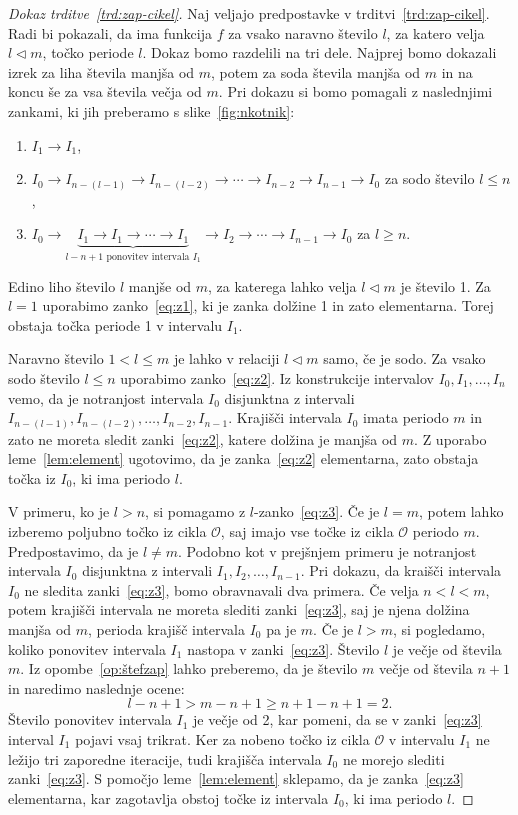 \documentclass[../TG_magistrsko_delo_sections.tex]{subfiles}
\begin{document}
\begin{proof}[Dokaz trditve~\ref{trd:zap-cikel}]
Naj veljajo predpostavke v trditvi~\ref{trd:zap-cikel}. Radi bi pokazali, da ima funkcija $f$ za vsako naravno število $l$, za katero velja $l\triangleleft m$, točko periode $l$. Dokaz bomo razdelili na tri dele. Najprej bomo dokazali izrek za liha števila manjša od $m$, potem za soda števila manjša od $m$ in na koncu še za vsa števila večja od $m$.
Pri dokazu si bomo pomagali z naslednjimi zankami, ki jih preberamo s slike~\ref{fig:nkotnik}:
\begin{enumerate}[label={(Z\arabic*)}]
\item $I_1 \to I_1$,\label{eq:z1}
\item$I_0\to I_{n-(l-1)} \to I_{n-(l-2)} \to \cdots \to I_{n-2} \to I_{n-1} \to I_0$ za sodo število $l \leq n$,\label{eq:z2}
\item $I_0\to\underbrace{I_1 \to I_1 \to \cdots  \to I_1}_{l - n +1 \text{ ponovitev intervala } I_1} \to I_2 \to \cdots \to I_{n-1} \to I_0 $ za $l \geq n$.\label{eq:z3}
\end{enumerate}
Edino liho število $l$ manjše od $m$, za katerega lahko velja $l\triangleleft m$ je število 1. Za $l=1$ uporabimo zanko~\ref{eq:z1}, ki je zanka dolžine 1 in zato elementarna. Torej obstaja točka periode 1 v intervalu $I_1$.

Naravno število  $1<l \leq m$ je lahko v relaciji $l \triangleleft m$ samo, če je sodo. Za vsako sodo število $l \leq n$ uporabimo zanko~\ref{eq:z2}.
Iz konstrukcije intervalov $I_0, I_1, \dots, I_n$ vemo, da je notranjost intervala $I_0$ disjunktna z intervali $I_{n-(l-1)}, I_{n-(l-2)}, \dots, I_{n-2}, I_{n-1}$. Krajišči intervala $I_0$ imata periodo $m$ in zato ne moreta sledit zanki~\ref{eq:z2}, katere dolžina je manjša od $m$. Z uporabo leme~\ref{lem:element} ugotovimo, da je zanka~\ref{eq:z2} elementarna, zato obstaja točka iz $I_0$, ki ima periodo $l$.

V primeru, ko je $l >n$, si pomagamo z $l$-zanko~\ref{eq:z3}.
Če je $l=m$, potem lahko izberemo poljubno točko iz cikla $\mathcal{O}$, saj imajo vse točke iz cikla $\mathcal{O}$ periodo $m$. Predpostavimo, da je $l \neq m$. Podobno kot v prejšnjem primeru je notranjost intervala $I_0$ disjunktna z intervali $I_1, I_2, \dots, I_{n-1}$. Pri dokazu, da kraišči intervala $I_0$ ne sledita zanki~\ref{eq:z3}, bomo obravnavali dva primera. Če velja $n<l<m$, potem krajišči intervala ne moreta slediti zanki~\ref{eq:z3}, saj je njena dolžina manjša od $m$, perioda krajišč intervala $I_0$ pa je $m$. Če je $l >m$, si pogledamo, koliko ponovitev intervala $I_1$ nastopa v zanki~\ref{eq:z3}. Število $l$ je večje od števila $m$. Iz opombe~\ref{op:štefzap} lahko preberemo, da je število $m$ večje od števila $n+1$ in naredimo naslednje ocene:
$$l-n+1>m-n+1 \geq n+1-n+1 = 2.$$
Število ponovitev intervala $I_1$ je večje od 2, kar pomeni, da se v zanki~\ref{eq:z3} interval $I_1$ pojavi vsaj trikrat. Ker za nobeno točko iz cikla $\mathcal{O}$ v intervalu $I_1$ ne ležijo tri zaporedne iteracije, tudi krajišča intervala $I_0$ ne morejo slediti zanki~\ref{eq:z3}. S pomočjo leme~\ref{lem:element} sklepamo, da je zanka~\ref{eq:z3} elementarna, kar zagotavlja obstoj točke iz intervala $I_0$, ki ima periodo $l$.
\end{proof}
\end{document}
